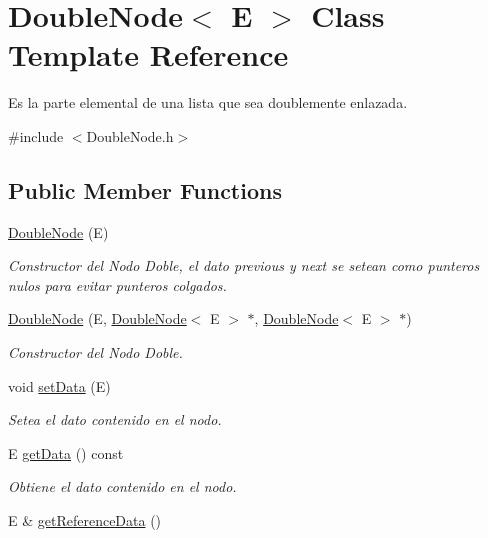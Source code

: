 \hypertarget{class_double_node}{\section{Double\-Node$<$ E $>$ Class Template Reference}
\label{class_double_node}
}


Es la parte elemental de una lista que sea doublemente enlazada.  




{\ttfamily \#include $<$Double\-Node.\-h$>$}

\subsection*{Public Member Functions}
\begin{DoxyCompactItemize}
\item 
\hyperlink{class_double_node_a915ac8a626f09ec53db64b7c5b294b2d}{Double\-Node} (E)
\begin{DoxyCompactList}\small\item\em Constructor del Nodo Doble, el dato previous y next se setean como punteros nulos para evitar punteros colgados. \end{DoxyCompactList}\item 
\hyperlink{class_double_node_a53d29dbf397d39b420f64ab943b62cee}{Double\-Node} (E, \hyperlink{class_double_node}{Double\-Node}$<$ E $>$ $\ast$, \hyperlink{class_double_node}{Double\-Node}$<$ E $>$ $\ast$)
\begin{DoxyCompactList}\small\item\em Constructor del Nodo Doble. \end{DoxyCompactList}\item 
void \hyperlink{class_double_node_a21f86a81b7d4e4db966e07ce06da4f3a}{set\-Data} (E)
\begin{DoxyCompactList}\small\item\em Setea el dato contenido en el nodo. \end{DoxyCompactList}\item 
E \hyperlink{class_double_node_a59310f31d21f431febc4d329e1f10699}{get\-Data} () const 
\begin{DoxyCompactList}\small\item\em Obtiene el dato contenido en el nodo. \end{DoxyCompactList}\item 
E \& \hyperlink{class_double_node_ac6b096a9a3a404f73e26b7319372fcbb}{get\-Reference\-Data} ()
\item 

\end{DoxyCompactItemize}
